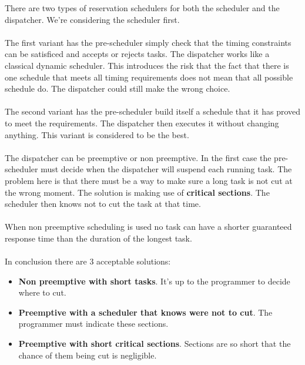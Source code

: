 \documentclass[../main.tex]{subfiles}
\begin{document}
There are two types of reservation schedulers for both the scheduler and the dispatcher. We're considering the scheduler first.\\\\
The first variant has the pre-scheduler simply check that the timing constraints can be satisficed and accepts or rejects tasks. The dispatcher works like a classical dynamic scheduler. This introduces the risk that the fact that there is one schedule that meets all timing requirements does not mean that all possible schedule do. The dispatcher could still make the wrong choice.
\\\\
The second variant has the pre-scheduler build itself a schedule that it has proved to meet the requirements. The dispatcher then executes it without changing anything. This variant is considered to be the best.
\\\\
The dispatcher can be preemptive or non preemptive. In the first case the pre-scheduler must decide when the dispatcher will suspend each running task. The problem here is that there must be a way to make sure a long task is not cut at the wrong moment. The solution is making use of \textbf{critical sections}. The scheduler then knows not to cut the task at that time.
\\\\
When non preemptive scheduling is used no task can have a shorter guaranteed response time than the duration of the longest task.
\\\\
In conclusion there are 3 acceptable solutions:
\begin{itemize}
	\item \textbf{Non preemptive with short tasks}. It's up to the programmer to decide where to cut.
	\item \textbf{Preemptive with a scheduler that knows were not to cut}. The programmer must indicate these sections.
	\item \textbf{Preemptive with short critical sections}. Sections are so short that the chance of them being cut is negligible.
\end{itemize}
\end{document}

